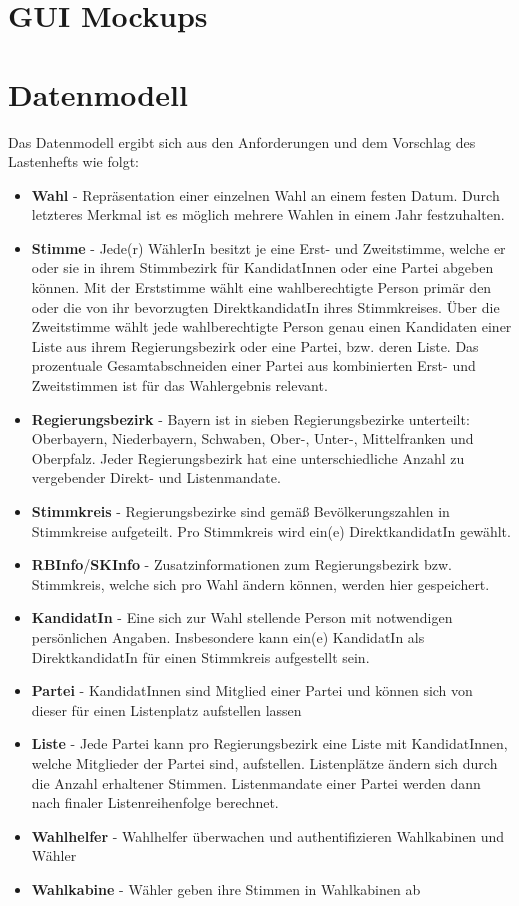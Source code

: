 \documentclass[a4paper,12pt]{article}
\begin{document}
\section{GUI Mockups}


\section{Datenmodell}
Das Datenmodell ergibt sich aus den Anforderungen und dem Vorschlag des Lastenhefts wie folgt:
\begin{itemize}
  \item \textbf{Wahl} - Repräsentation einer einzelnen Wahl an einem festen Datum. 
        Durch letzteres Merkmal ist es möglich mehrere Wahlen in einem Jahr festzuhalten.
  \item \textbf{Stimme} - Jede(r) WählerIn besitzt je eine Erst- und Zweitstimme, welche er oder sie in ihrem
        Stimmbezirk für KandidatInnen oder eine Partei abgeben können. Mit der Erststimme wählt eine wahlberechtigte Person
        primär den oder die von ihr bevorzugten DirektkandidatIn ihres Stimmkreises. Über die Zweitstimme wählt 
        jede wahlberechtigte Person genau einen Kandidaten einer Liste aus ihrem Regierungsbezirk oder eine Partei, bzw. deren Liste. 
        Das prozentuale Gesamtabschneiden einer Partei aus kombinierten Erst- und Zweitstimmen ist für das 
        Wahlergebnis relevant.
  \item \textbf{Regierungsbezirk} - Bayern ist in sieben Regierungsbezirke unterteilt: Oberbayern,
        Niederbayern, Schwaben, Ober-, Unter-, Mittelfranken und Oberpfalz. Jeder Regierungsbezirk
        hat eine unterschiedliche Anzahl zu vergebender Direkt- und Listenmandate.
  \item \textbf{Stimmkreis} - Regierungsbezirke sind gemäß Bevölkerungszahlen in Stimmkreise aufgeteilt.
        Pro Stimmkreis wird ein(e) DirektkandidatIn gewählt.
  \item \textbf{RBInfo}/\textbf{SKInfo} - Zusatzinformationen zum Regierungsbezirk bzw. Stimmkreis,
        welche sich pro Wahl ändern können, werden hier gespeichert.
  \item \textbf{KandidatIn} - Eine sich zur Wahl stellende Person mit notwendigen persönlichen Angaben. 
        Insbesondere kann ein(e) KandidatIn als DirektkandidatIn für einen Stimmkreis aufgestellt sein.
  \item \textbf{Partei} - KandidatInnen sind Mitglied einer Partei und können sich von dieser für einen 
        Listenplatz aufstellen lassen
  \item \textbf{Liste} - Jede Partei kann pro Regierungsbezirk eine Liste mit KandidatInnen, welche Mitglieder der 
        Partei sind, aufstellen. Listenplätze ändern sich durch die Anzahl erhaltener Stimmen. Listenmandate
        einer Partei werden dann nach finaler Listenreihenfolge berechnet.
  \item \textbf{Wahlhelfer} - Wahlhelfer überwachen und authentifizieren Wahlkabinen und Wähler
  \item \textbf{Wahlkabine} - Wähler geben ihre Stimmen in Wahlkabinen ab
\end{itemize}
\end{document}
